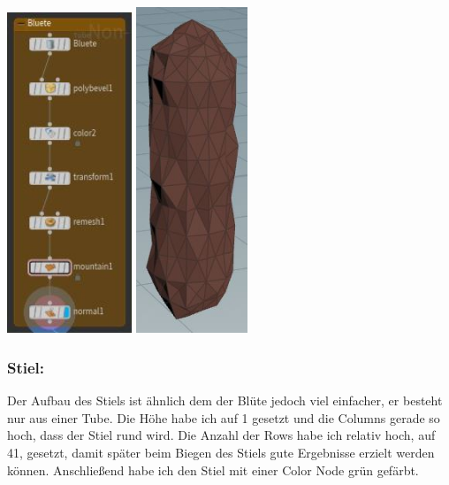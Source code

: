 \documentclass[paper=a4,fontsize=12pt,ngerman]{scrartcl}
\begin{document}
	\begin{minipage}{0.5\textwidth}
		\includegraphics[width=0.28\textwidth]{graphics/bluete_node.jpg}
		\includegraphics[width=0.25\textwidth]{graphics/bluete.jpg}
	\end{minipage}
	\subsubsection*{Stiel:}
	Der Aufbau des Stiels ist ähnlich dem der Blüte jedoch viel einfacher, er besteht nur aus einer Tube. Die Höhe habe ich auf 1 gesetzt und die Columns gerade so hoch, dass der Stiel rund wird. Die Anzahl der Rows habe ich relativ hoch, auf 41, gesetzt, damit später beim Biegen des Stiels gute Ergebnisse erzielt werden können. Anschließend habe ich den Stiel mit einer Color Node grün gefärbt.
\end{document}
